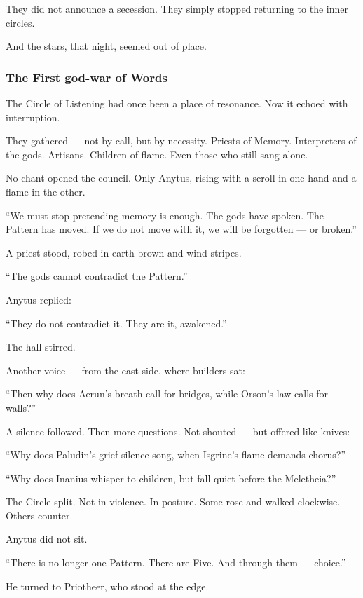 \documentclass[12pt]{article}
\begin{document}
They did not announce a secession.  
They simply stopped returning to the inner circles.

And the stars, that night, seemed out of place.

\dotfill

\subsubsection{The First god-war of Words}

The Circle of Listening had once been a place of resonance.  
Now it echoed with interruption.

They gathered — not by call, but by necessity.  
Priests of Memory.  
Interpreters of the gods.  
Artisans. Children of flame.  
Even those who still sang alone.

No chant opened the council.  
Only Anytus, rising with a scroll in one hand and a flame in the other.

 “We must stop pretending memory is enough.  
 The gods have spoken.  
 The Pattern has moved.  
 If we do not move with it, we will be forgotten — or broken.”

A priest stood, robed in earth-brown and wind-stripes.

 “The gods cannot contradict the Pattern.”

Anytus replied:

 “They do not contradict it. They are it, awakened.”

The hall stirred.

Another voice — from the east side, where builders sat:

 “Then why does Aerun’s breath call for bridges,  
 while Orson’s law calls for walls?”

A silence followed.  
Then more questions.  
Not shouted — but offered like knives:

 “Why does Paludin’s grief silence song,  
 when Isgrine’s flame demands chorus?”

 “Why does Inanius whisper to children,  
 but fall quiet before the Meletheia?”

The Circle split.  
Not in violence.  
In posture.  
Some rose and walked clockwise.  
Others counter.

Anytus did not sit.

 “There is no longer one Pattern.  
 There are Five.  
 And through them — choice.”

He turned to Priotheer, who stood at the edge.
\end{document}

